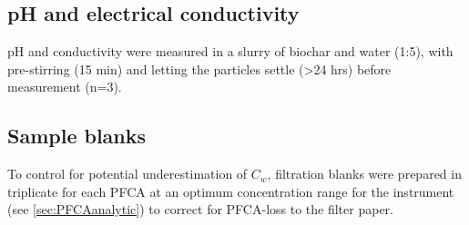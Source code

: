 \begin{table}
    \caption{Spike concentrations (SC) in \textmu g L\textsuperscript{-1} used for the batch tests. MIX = cocktail spike concentration for biochar-water batch tests in triplicates, MIX-S = cocktail spike concentration for biochar-soil-water and soil-water batch tests.}
    \label{tab:spikeConcentrations}
\end{table}

\subsection{pH and electrical conductivity}
pH and conductivity were measured in a slurry of biochar and water (1:5), with pre-stirring (15 min) and letting the particles settle (\textgreater 24 hrs) before measurement (n=3). 

\subsection{Sample blanks}
To control for potential underestimation of $C_w$, filtration blanks were prepared in triplicate for each PFCA at an optimum concentration range for the instrument (see \cref{sec:PFCAanalytic}) to correct for PFCA-loss to the filter paper. 


